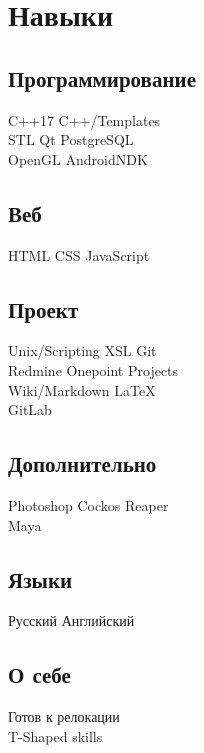 \documentclass[a4paper]{curricula-vitae}
\begin{document}
\begin{minipage}[t]{0.33\textwidth}
\section{Навыки}

\subsection{Программирование}
C++17 \textbullet{} C++/Templates \\
STL \textbullet{} Qt \textbullet{} PostgreSQL \\
OpenGL \textbullet{} AndroidNDK


\insertspace

\subsection{Веб}
HTML \textbullet{} CSS \textbullet{} JavaScript

\insertspace

\subsection{Проект}
Unix/Scripting \textbullet{} XSL \textbullet{} Git \\
Redmine \textbullet{} Onepoint Projects \\
Wiki/Markdown \textbullet{} \LaTeX \\
GitLab

\insertspace

\subsection{Дополнительно}
Photoshop \textbullet{} Cockos Reaper \\
Maya

\insertspace

\subsection{Языки}
Русский \textbullet{} Английский

\insertspace

\subsection{О себе}
Готов к релокации \\
T-Shaped skills

\insertspace
\insertspace



\end{minipage}%
\end{document}
